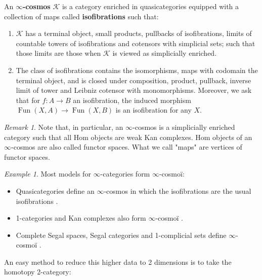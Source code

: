 \documentclass[10pt,a4paper]{article}
\newcommand{\ca}[1]{\mathcal{#1}}
\DeclareMathOperator{\Fun}{Fun}
\theoremstyle{plain}
\theoremstyle{definition}
\theoremstyle{remark}
\newtheorem{remark}[theorem]{Remark}
\newtheorem{example}[theorem]{Example}
\begin{document}
\begin{definition}
    \label{def:inf_cosmos}
    An \textbf{$\infty$-cosmos} $\ca K$ is a category enriched in quasicategories equipped with a collection of maps called \textbf{isofibrations} such that:
    \begin{enumerate}
        \item $\ca K$ has a terminal object, small products, pullbacks of isofibrations, limits of countable towers of isofibrations and cotensors with simplicial sets; such that those limits are those when $\ca K$ is viewed as simplicially enriched.
        \item The class of isofibrations contains the isomorphisms, maps with codomain the terminal object, and is closed under composition, product, pullback, inverse limit of tower and Leibniz cotensor with monomorphisms. Moreover, we ask that for $f : A \to B$ an isofibration, the induced morphism $\Fun(X, A) \to \Fun(X, B)$ is an isofibration for any $X$.
    \end{enumerate}
\end{definition}

\begin{remark}
    Note that, in particular, an $\infty$-cosmos is a simplicially enriched category such that all Hom objects are weak Kan complexes. Hom objects of an $\infty$-cosmos are also called functor spaces. What we call "maps" are vertices of functor spaces.
\end{remark}

\begin{example}
    \label{ex:infcats_cosmoi}
    Most models for $\infty$-categories form $\infty$-cosmoï:
    \begin{itemize}
        \item Quasicategories define an $\infty$-cosmos in which the isofibrations are the usual isofibrations \cite[Proposition 1.2.10]{riehl_verity}.
        \item 1-categories and Kan complexes also form $\infty$-cosmoï \cite[Propositions 1.2.11 and 1.2.12]{riehl_verity}.
        \item Complete Segal spaces, Segal categories and 1-complicial sets define $\infty$-cosmoï \cite[Example 1.2.24]{riehl_verity}.
    \end{itemize}
\end{example}

An easy method to reduce this higher data to 2 dimensions is to take the homotopy 2-category:
\end{document}
